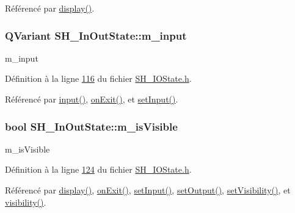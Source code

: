 Référencé par \hyperlink{classSH__InOutState_a918e8a7f5fe00dc16004e46eeee1281d}{display()}.

\hypertarget{classSH__InOutState_ae43d6fdc62047f285913837648a1e883}{
\subsubsection[{m\-\_\-input}]{\setlength{\rightskip}{0pt plus 5cm}Q\-Variant S\-H\-\_\-\-In\-Out\-State\-::m\-\_\-input\hspace{0.3cm}{\ttfamily [private]}}}\label{classSH__InOutState_ae43d6fdc62047f285913837648a1e883}


m\-\_\-input 



Définition à la ligne \hyperlink{SH__IOState_8h_source_l00116}{116} du fichier \hyperlink{SH__IOState_8h_source}{S\-H\-\_\-\-I\-O\-State.\-h}.



Référencé par \hyperlink{classSH__InOutState_a04364c76d2fd8a3781e7b325955e5bd9}{input()}, \hyperlink{classSH__InOutState_a36636cba0d68476288bce5fd4c041db0}{on\-Exit()}, et \hyperlink{classSH__InOutState_a0206ab7d5616f28b0da7bfd5451614e8}{set\-Input()}.

\hypertarget{classSH__InOutState_a8fd66b185c9a55f0e84daa97e2acf53a}{
\subsubsection[{m\-\_\-is\-Visible}]{\setlength{\rightskip}{0pt plus 5cm}bool S\-H\-\_\-\-In\-Out\-State\-::m\-\_\-is\-Visible\hspace{0.3cm}{\ttfamily [private]}}}\label{classSH__InOutState_a8fd66b185c9a55f0e84daa97e2acf53a}


m\-\_\-is\-Visible 



Définition à la ligne \hyperlink{SH__IOState_8h_source_l00124}{124} du fichier \hyperlink{SH__IOState_8h_source}{S\-H\-\_\-\-I\-O\-State.\-h}.



Référencé par \hyperlink{classSH__InOutState_a918e8a7f5fe00dc16004e46eeee1281d}{display()}, \hyperlink{classSH__InOutState_a36636cba0d68476288bce5fd4c041db0}{on\-Exit()}, \hyperlink{classSH__InOutState_a0206ab7d5616f28b0da7bfd5451614e8}{set\-Input()}, \hyperlink{classSH__InOutState_a7dc244d72e09fdbc30eb3a704b05a4d8}{set\-Output()}, \hyperlink{classSH__InOutState_a7706a2ea1367ab3416db27fa0f4794f7}{set\-Visibility()}, et \hyperlink{classSH__InOutState_a8c496b2fe21a51a587c6e4409c0f37ec}{visibility()}.

